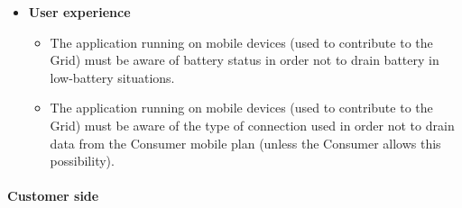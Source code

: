 \begin{itemize}
\begin{itemize}
    \end{itemize}
    \item \textbf{User experience}
    \begin{itemize}
        \item The application running on mobile devices (used to contribute to the Grid) must be aware of battery status in order not to drain battery in low-battery situations.
        \item The application running on mobile devices (used to contribute to the Grid) must be aware of the type of connection used in order not to drain data from the Consumer mobile plan (unless the Consumer allows this possibility).
    \end{itemize}
\end{itemize}
\paragraph{Customer side}
